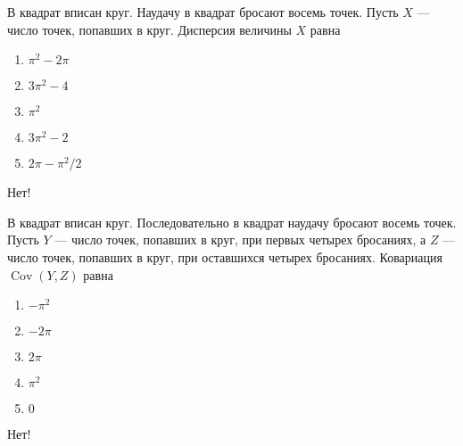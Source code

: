 \documentclass[t]{beamer}
\DeclareMathOperator{\Cov}{Cov}
\begin{document}
 \begin{frame} \label{9-No} 
\begin{block}{9} 

В квадрат вписан круг. Наудачу в квадрат бросают восемь точек. Пусть $X$ — число точек, попавших в круг. Дисперсия величины $X$ равна     


 \end{block} 
\begin{enumerate} 
\item[] \hyperlink{9-No}{\beamergotobutton{} $\pi^2 - 2 \pi$}
\item[] \hyperlink{9-No}{\beamergotobutton{} $3\pi^2 - 4$}
\item[] \hyperlink{9-No}{\beamergotobutton{} $\pi^2$}
\item[] \hyperlink{9-No}{\beamergotobutton{} $3\pi^2 - 2$
}
\item[] \hyperlink{9-Yes}{\beamergotobutton{} $2\pi - \pi^2 / 2$}
\end{enumerate} 

 \alert{Нет!} 
\end{frame} 


 \begin{frame} \label{10-No} 
\begin{block}{10} 

В квадрат вписан круг. Последовательно в квадрат наудачу бросают восемь точек. Пусть $Y$ — число точек, попавших в круг, при первых четырех бросаниях, а $Z$ — число точек, попавших в круг, при оставшихся четырех бросаниях. Ковариация $\Cov(Y,Z)$ равна
     


 \end{block} 
\begin{enumerate} 
\item[] \hyperlink{10-No}{\beamergotobutton{} $-\pi^2$}
\item[] \hyperlink{10-No}{\beamergotobutton{} $-2\pi$
}
\item[] \hyperlink{10-No}{\beamergotobutton{} $2\pi$}
\item[] \hyperlink{10-No}{\beamergotobutton{} $\pi^2$}
\item[] \hyperlink{10-Yes}{\beamergotobutton{} $0$}
\end{enumerate} 

 \alert{Нет!} 
\end{frame} 
\end{document}
